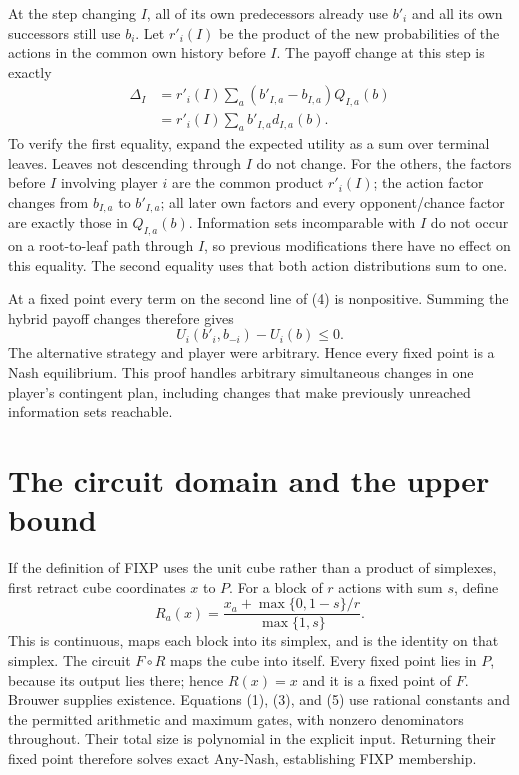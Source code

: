 \documentclass[11pt]{article}
\begin{document}
At the step changing $I$, all of its own predecessors already use $b'_i$
and all its own successors still use $b_i$. Let
$r'_i(I)$ be the product of the new probabilities of the actions in the
common own history before $I$. The payoff change at this step is exactly
\[
 \begin{aligned}
 \Delta_I
 &=r'_i(I)\sum_a (b'_{I,a}-b_{I,a})Q_{I,a}(b)\\
 &=r'_i(I)\sum_a b'_{I,a}d_{I,a}(b).                              \tag{4}
 \end{aligned}
\]
To verify the first equality, expand the expected utility as a sum over
terminal leaves. Leaves not descending through $I$ do not change.
For the others, the factors before $I$ involving player $i$ are the
common product $r'_i(I)$; the action factor changes from $b_{I,a}$ to
$b'_{I,a}$; all later own factors and every opponent/chance factor are
exactly those in $Q_{I,a}(b)$. Information sets incomparable with $I$
do not occur on a root-to-leaf path through $I$, so previous modifications
there have no effect on this equality. The second equality uses that
both action distributions sum to one.

At a fixed point every term on the second line of (4) is nonpositive.
Summing the hybrid payoff changes therefore gives
\[
                         U_i(b'_i,b_{-i})-U_i(b)\leq0.
\]
The alternative strategy and player were arbitrary. Hence every fixed
point is a Nash equilibrium. This proof handles arbitrary simultaneous
changes in one player's contingent plan, including changes that make
previously unreached information sets reachable.

\section*{The circuit domain and the upper bound}
If the definition of FIXP uses the unit cube rather than a product of
simplexes, first retract cube coordinates $x$ to $P$. For a block of $r$
actions with sum $s$, define
\[
 R_a(x)=\frac{x_a+\max\{0,1-s\}/r}{\max\{1,s\}}.                  \tag{5}
\]
This is continuous, maps each block into its simplex, and is the identity
on that simplex. The circuit $F\circ R$ maps the cube into itself.
Every fixed point lies in $P$, because its output lies there; hence
$R(x)=x$ and it is a fixed point of $F$. Brouwer supplies existence.
Equations (1), (3), and (5) use rational constants and the permitted
arithmetic and maximum gates, with nonzero denominators throughout.
Their total size is polynomial in the explicit input. Returning their
fixed point therefore solves exact Any-Nash, establishing FIXP membership.
\end{document}
